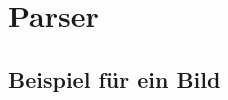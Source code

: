 \chapter{Parser}
\label{chap:chap2}

\lipsum[1]{}

\section{Beispiel für ein Bild}
\label{sec:objekthierarchie}

\lipsum[2]{}

